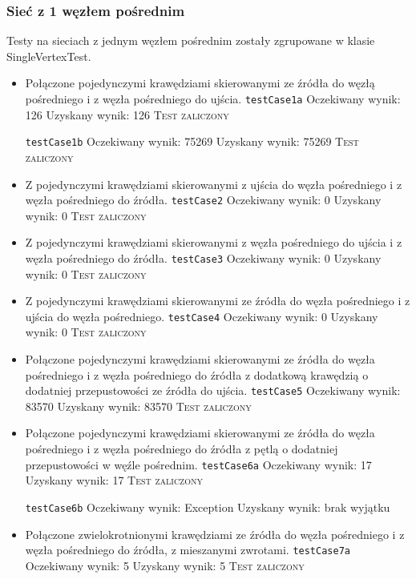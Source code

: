 \subsubsection{Sieć z 1 węzłem pośrednim}
Testy na sieciach z jednym węzłem pośrednim zostały zgrupowane
w klasie SingleVertexTest.
\begin{itemize}[nosep]
    \item Połączone pojedynczymi krawędziami skierowanymi ze źródła do węzłą
    pośredniego i z węzła pośredniego do ujścia.
    \texttt{testCase1a}
    Oczekiwany wynik: 126
    Uzyskany wynik: 126
    \textsc{Test zaliczony}

    \texttt{testCase1b}
    Oczekiwany wynik: 75269
    Uzyskany wynik: 75269
    \textsc{Test zaliczony}

    \item Z pojedynczymi krawędziami skierowanymi z ujścia do węzła pośredniego
    i z węzła pośredniego do źródła.
    \texttt{testCase2}
    Oczekiwany wynik: 0
    Uzyskany wynik: 0
    \textsc{Test zaliczony}

    \item Z pojedynczymi krawędziami skierowanymi z węzła pośredniego do ujścia
    i z węzła pośredniego do źródła.
    \texttt{testCase3}
    Oczekiwany wynik: 0
    Uzyskany wynik: 0
    \textsc{Test zaliczony}

    \item Z pojedynczymi krawędziami skierowanymi ze źródła do węzła pośredniego
    i z ujścia do węzła pośredniego.
    \texttt{testCase4}
    Oczekiwany wynik: 0
    Uzyskany wynik: 0
    \textsc{Test zaliczony}

    \item Połączone pojedynczymi krawędziami skierowanymi ze źródła do węzła
    pośredniego i z węzła pośredniego do źródła z dodatkową krawędzią o
    dodatniej przepustowości ze źródła do ujścia.
    \texttt{testCase5}
    Oczekiwany wynik: 83570
    Uzyskany wynik: 83570
    \textsc{Test zaliczony}

    \item Połączone pojedynczymi krawędziami skierowanymi ze źródła do węzła
    pośredniego i z węzła pośredniego do źródła z pętlą o dodatniej
    przepustowości w węźle pośrednim.
    \texttt{testCase6a}
    Oczekiwany wynik: 17
    Uzyskany wynik: 17
    \textsc{Test zaliczony}

    \texttt{testCase6b}
    Oczekiwany wynik: Exception
    Uzyskany wynik: brak wyjątku

    \item Połączone zwielokrotnionymi krawędziami ze źródła do węzła pośredniego
    i z węzła pośredniego do źródła, z mieszanymi zwrotami.
    \texttt{testCase7a}
    Oczekiwany wynik: 5
    Uzyskany wynik: 5
    \textsc{Test zaliczony}


\end{itemize}
